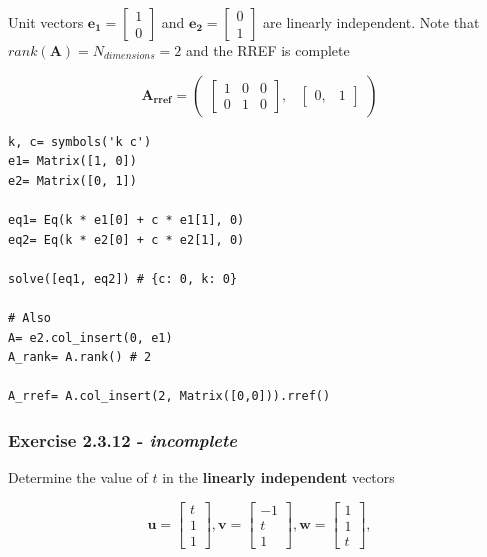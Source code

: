 Unit vectors $\mathbf{e_1} = \left[\begin{matrix}1\\0\end{matrix}\right]$ and
$\mathbf{e_2} = \left[\begin{matrix}0\\1\end{matrix}\right]$ are linearly independent.
Note that $rank(\mathbf{A}) = N_{dimensions} = 2$ and the RREF is complete

$$
\mathbf{A_{rref}} = \begin{pmatrix}\left[\begin{matrix}1 & 0 & 0\\0 & 1 & 0\end{matrix}\right], & \begin{bmatrix}0, & 1\end{bmatrix}\end{pmatrix}
$$

\begin{verbatim}
k, c= symbols('k c')
e1= Matrix([1, 0])
e2= Matrix([0, 1])

eq1= Eq(k * e1[0] + c * e1[1], 0)
eq2= Eq(k * e2[0] + c * e2[1], 0)

solve([eq1, eq2]) # {c: 0, k: 0}

# Also
A= e2.col_insert(0, e1)
A_rank= A.rank() # 2

A_rref= A.col_insert(2, Matrix([0,0])).rref()
\end{verbatim}

\subsubsection{Exercise 2.3.12 - \textit{incomplete}}

Determine the value of $t$ in the \textbf{linearly independent} vectors

$$
\mathbf{u} = \left[\begin{matrix}t\\1\\1\end{matrix}\right],
\mathbf{v} = \left[\begin{matrix}-1\\t\\1\end{matrix}\right],
\mathbf{w} = \left[\begin{matrix}1\\1\\t\end{matrix}\right],
$$

